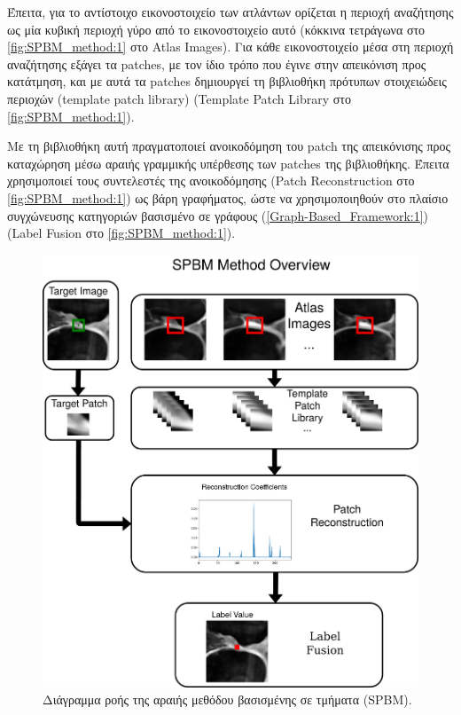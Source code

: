 \documentclass[a4paper,12pt]{article}
\begin{document}
Έπειτα, για το αντίστοιχο εικονοστοιχείο των ατλάντων ορίζεται η περιοχή
αναζήτησης ως μία κυβική περιοχή γύρο από το εικονοστοιχείο αυτό (κόκκινα
τετράγωνα στο \autoref{fig:SPBM_method:1} στο Atlas Images). Για κάθε
εικονοστοιχείο μέσα στη περιοχή αναζήτησης εξάγει τα patches, με τον ίδιο τρόπο
που έγινε στην απεικόνιση προς κατάτμηση, και με αυτά τα patches δημιουργεί τη
βιβλιοθήκη πρότυπων στοιχειώδεις περιοχών (template patch library) (Template
Patch Library στο \autoref{fig:SPBM_method:1}).

Με τη βιβλιοθήκη αυτή πραγματοποιεί ανοικοδόμηση του patch της απεικόνισης προς
καταχώρηση μέσω αραιής γραμμικής υπέρθεσης των patches της βιβλιοθήκης. Έπειτα
χρησιμοποιεί τους συντελεστές της ανοικοδόμησης (Patch Reconstruction στο
\autoref{fig:SPBM_method:1}) ως βάρη γραφήματος, ώστε να χρησιμοποιηθούν στο
πλαίσιο συγχώνευσης κατηγοριών βασισμένο σε γράφους
(\ref{Graph-Based_Framework:1}) (Label Fusion στο \autoref{fig:SPBM_method:1}).

\begin{figure}[H]
    \centering
    \includegraphics[width=\linewidth]{SPBM_method.png}
    \caption{Διάγραμμα ροής της αραιής μεθόδου βασισμένης σε τμήματα (SPBM).}
    \label{fig:SPBM_method:1}
\end{figure}
\end{document}
